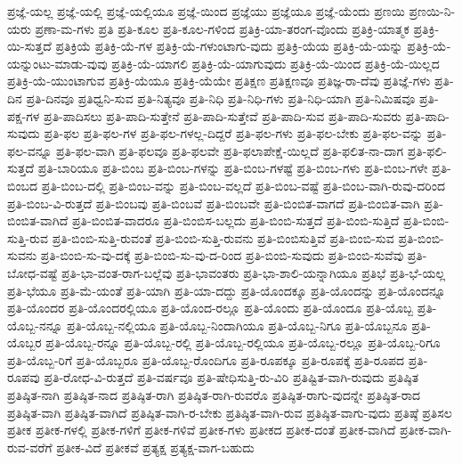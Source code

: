 {ಪ್ರಜ್ಞೆ-ಯಲ್ಲ
ಪ್ರಜ್ಞೆ-ಯಲ್ಲಿ
ಪ್ರಜ್ಞೆ-ಯಲ್ಲಿಯೂ
ಪ್ರಜ್ಞೆ-ಯಿಂದ
ಪ್ರಜ್ಞೆಯು
ಪ್ರಜ್ಞೆಯೂ
ಪ್ರಜ್ಞೆ-ಯೆಂದು
ಪ್ರಣಯಿ
ಪ್ರಣಯಿ-ನಿ-ಯರು
ಪ್ರಣಾ-ಮ-ಗಳು
ಪ್ರತಿ
ಪ್ರತಿ-ಕೂಲ
ಪ್ರತಿ-ಕೂಲ-ಗಳಿಂದ
ಪ್ರತಿಕ್ರಿ-ಯಾ-ತರಂಗ-ವೊಂದು
ಪ್ರತಿಕ್ರಿ-ಯಾತ್ಮಕ
ಪ್ರತಿಕ್ರಿ-ಯಿ-ಸುತ್ತದೆ
ಪ್ರತಿಕ್ರಿಯೆ
ಪ್ರತಿಕ್ರಿ-ಯೆ-ಗಳ
ಪ್ರತಿಕ್ರಿ-ಯೆ-ಗಳುಂಟಾಗು-ವುದು
ಪ್ರತಿಕ್ರಿ-ಯೆಯ
ಪ್ರತಿಕ್ರಿ-ಯೆ-ಯನ್ನು
ಪ್ರತಿಕ್ರಿ-ಯೆ-ಯನ್ನುಂಟು-ಮಾಡು-ವುವು
ಪ್ರತಿಕ್ರಿ-ಯೆ-ಯಾಗಲಿ
ಪ್ರತಿಕ್ರಿ-ಯೆ-ಯಾಗುವುದು
ಪ್ರತಿಕ್ರಿ-ಯೆ-ಯಿಂದ
ಪ್ರತಿಕ್ರಿ-ಯೆ-ಯಿಲ್ಲದ
ಪ್ರತಿಕ್ರಿ-ಯೆ-ಯುಂಟಾಗುವ
ಪ್ರತಿಕ್ರಿ-ಯೆಯೂ
ಪ್ರತಿಕ್ರಿ-ಯೆಯೇ
ಪ್ರತಿಕ್ಷಣ
ಪ್ರತಿಕ್ಷಣವೂ
ಪ್ರತಿಜ್ಞ-ರಾ-ದೆವು
ಪ್ರತಿಜ್ಞೆ-ಗಳು
ಪ್ರತಿ-ದಿನ
ಪ್ರತಿ-ದಿನವೂ
ಪ್ರತಿಧ್ವನಿ-ಸುವ
ಪ್ರತಿ-ನಿತ್ಯವೂ
ಪ್ರತಿ-ನಿಧಿ
ಪ್ರತಿ-ನಿಧಿ-ಗಳು
ಪ್ರತಿ-ನಿಧಿ-ಯಾಗಿ
ಪ್ರತಿ-ನಿಮಿಷವೂ
ಪ್ರತಿ-ಪಕ್ಷ-ಗಳ
ಪ್ರತಿ-ಪಾದಿಸಲು
ಪ್ರತಿ-ಪಾದಿ-ಸುತ್ತೇನೆ
ಪ್ರತಿ-ಪಾದಿ-ಸುತ್ತೇವೆ
ಪ್ರತಿ-ಪಾದಿ-ಸುವ
ಪ್ರತಿ-ಪಾದಿ-ಸುವರು
ಪ್ರತಿ-ಪಾದಿ-ಸುವುದು
ಪ್ರತಿ-ಫಲ
ಪ್ರತಿ-ಫಲ-ಗಳ
ಪ್ರತಿ-ಫಲ-ಗಳಲ್ಲ-ದಿದ್ದರೆ
ಪ್ರತಿ-ಫಲ-ಗಳು
ಪ್ರತಿ-ಫಲ-ಬೇಕು
ಪ್ರತಿ-ಫಲ-ವನ್ನು
ಪ್ರತಿ-ಫಲ-ವನ್ನೂ
ಪ್ರತಿ-ಫಲ-ವಾಗಿ
ಪ್ರತಿ-ಫಲವೂ
ಪ್ರತಿ-ಫಲವೇ
ಪ್ರತಿ-ಫಲಾಪೇಕ್ಷೆ-ಯಿಲ್ಲದೆ
ಪ್ರತಿ-ಫಲಿತ-ನಾ-ದಾಗ
ಪ್ರತಿ-ಫಲಿ-ಸುತ್ತದೆ
ಪ್ರತಿ-ಬಾರಿಯೂ
ಪ್ರತಿ-ಬಿಂಬ
ಪ್ರತಿ-ಬಿಂಬ-ಗಳನ್ನು
ಪ್ರತಿ-ಬಿಂಬ-ಗಳಷ್ಟೆ
ಪ್ರತಿ-ಬಿಂಬ-ಗಳು
ಪ್ರತಿ-ಬಿಂಬ-ಗಳೇ
ಪ್ರತಿ-ಬಿಂಬದ
ಪ್ರತಿ-ಬಿಂಬ-ದಲ್ಲಿ
ಪ್ರತಿ-ಬಿಂಬ-ವನ್ನು
ಪ್ರತಿ-ಬಿಂಬ-ವಲ್ಲದೆ
ಪ್ರತಿ-ಬಿಂಬ-ವಷ್ಟೆ
ಪ್ರತಿ-ಬಿಂಬ-ವಾಗಿ-ರುವು-ದರಿಂದ
ಪ್ರತಿ-ಬಿಂಬ-ವಿ-ರುತ್ತದೆ
ಪ್ರತಿ-ಬಿಂಬವು
ಪ್ರತಿ-ಬಿಂಬವೆ
ಪ್ರತಿ-ಬಿಂಬವೇ
ಪ್ರತಿ-ಬಿಂಬಿತ-ವಾಗದೆ
ಪ್ರತಿ-ಬಿಂಬಿತ-ವಾಗಿ
ಪ್ರತಿ-ಬಿಂಬಿತ-ವಾಗಿದೆ
ಪ್ರತಿ-ಬಿಂಬಿತ-ವಾದರೂ
ಪ್ರತಿ-ಬಿಂಬಿಸ-ಬಲ್ಲದು
ಪ್ರತಿ-ಬಿಂಬಿ-ಸುತ್ತದೆ
ಪ್ರತಿ-ಬಿಂಬಿ-ಸುತ್ತಿದೆ
ಪ್ರತಿ-ಬಿಂಬಿ-ಸುತ್ತಿ-ರುವ
ಪ್ರತಿ-ಬಿಂಬಿ-ಸುತ್ತಿ-ರುವಂತೆ
ಪ್ರತಿ-ಬಿಂಬಿ-ಸುತ್ತಿ-ರುವನು
ಪ್ರತಿ-ಬಿಂಬಿಸುತ್ತಿವೆ
ಪ್ರತಿ-ಬಿಂಬಿ-ಸುವ
ಪ್ರತಿ-ಬಿಂಬಿ-ಸುವನು
ಪ್ರತಿ-ಬಿಂಬಿ-ಸು-ವು-ದಕ್ಕೆ
ಪ್ರತಿ-ಬಿಂಬಿ-ಸು-ವು-ದ-ರಿಂದ
ಪ್ರತಿ-ಬಿಂಬಿ-ಸುವುದು
ಪ್ರತಿ-ಬಿಂಬಿ-ಸುವೆವು
ಪ್ರತಿ-ಬೋಧ-ವಷ್ಟೆ
ಪ್ರತಿ-ಭಾ-ವಂತ-ರಾಗ-ಬಲ್ಲೆವು
ಪ್ರತಿ-ಭಾವಂತರು
ಪ್ರತಿ-ಭಾ-ಶಾಲಿ-ಯನ್ನಾಗಿಯೂ
ಪ್ರತಿಭೆ
ಪ್ರತಿ-ಭೆ-ಯಲ್ಲ
ಪ್ರತಿ-ಭೆಯೂ
ಪ್ರತಿ-ಮೆ-ಯಂತೆ
ಪ್ರತಿ-ಯಾಗಿ
ಪ್ರತಿ-ಯಾ-ದದ್ದು
ಪ್ರತಿ-ಯೊಂದಕ್ಕೂ
ಪ್ರತಿ-ಯೊಂದನ್ನು
ಪ್ರತಿ-ಯೊಂದನ್ನೂ
ಪ್ರತಿ-ಯೊಂದರ
ಪ್ರತಿ-ಯೊಂದರಲ್ಲಿಯೂ
ಪ್ರತಿ-ಯೊಂದ-ರಲ್ಲೂ
ಪ್ರತಿ-ಯೊಂದು
ಪ್ರತಿ-ಯೊಂದೂ
ಪ್ರತಿ-ಯೊಬ್ಬ
ಪ್ರತಿ-ಯೊಬ್ಬ-ನನ್ನೂ
ಪ್ರತಿ-ಯೊಬ್ಬ-ನಲ್ಲಿಯೂ
ಪ್ರತಿ-ಯೊಬ್ಬ-ನಿಂದಾಗಿಯೂ
ಪ್ರತಿ-ಯೊಬ್ಬ-ನಿಗೂ
ಪ್ರತಿ-ಯೊಬ್ಬನೂ
ಪ್ರತಿ-ಯೊಬ್ಬರ
ಪ್ರತಿ-ಯೊಬ್ಬ-ರನ್ನೂ
ಪ್ರತಿ-ಯೊಬ್ಬ-ರಲ್ಲಿ
ಪ್ರತಿ-ಯೊಬ್ಬ-ರಲ್ಲಿಯೂ
ಪ್ರತಿ-ಯೊಬ್ಬ-ರಲ್ಲೂ
ಪ್ರತಿ-ಯೊಬ್ಬ-ರಿಗೂ
ಪ್ರತಿ-ಯೊಬ್ಬ-ರಿಗೆ
ಪ್ರತಿ-ಯೊಬ್ಬರೂ
ಪ್ರತಿ-ಯೊಬ್ಬ-ರೊಂದಿಗೂ
ಪ್ರತಿ-ರೂಪಕ್ಕೂ
ಪ್ರತಿ-ರೂಪಕ್ಕೆ
ಪ್ರತಿ-ರೂಪದ
ಪ್ರತಿ-ರೂಪವು
ಪ್ರತಿ-ರೋಧ-ವಿ-ರುತ್ತದೆ
ಪ್ರತಿ-ವರ್ಷವೂ
ಪ್ರತಿ-ಷೇಧಿಸುತ್ತಿ-ರು-ವಿರಿ
ಪ್ರತಿಷ್ಟಿತ-ವಾಗಿ-ರುವುದು
ಪ್ರತಿಷ್ಠಿತ
ಪ್ರತಿಷ್ಠಿತ-ನಾಗಿ
ಪ್ರತಿಷ್ಠಿತ-ನಾದ
ಪ್ರತಿಷ್ಠಿತ-ರಾಗಿ
ಪ್ರತಿಷ್ಠಿತ-ರಾಗಿ-ರುವರೊ
ಪ್ರತಿಷ್ಠಿತ-ರಾಗು-ವುದನ್ನೇ
ಪ್ರತಿಷ್ಠಿತ-ರಾದ
ಪ್ರತಿಷ್ಠಿತ-ವಾಗಿ
ಪ್ರತಿಷ್ಠಿತ-ವಾಗಿದೆ
ಪ್ರತಿಷ್ಠಿತ-ವಾಗಿ-ರ-ಬೇಕು
ಪ್ರತಿಷ್ಠಿತ-ವಾಗಿ-ರುವ
ಪ್ರತಿಷ್ಠಿತ-ವಾಗು-ವುದು
ಪ್ರತಿಷ್ಠೆ
ಪ್ರತಿಸಲ
ಪ್ರತೀಕ
ಪ್ರತೀಕ-ಗಳಲ್ಲಿ
ಪ್ರತೀಕ-ಗಳಿಗೆ
ಪ್ರತೀಕ-ಗಳಿವೆ
ಪ್ರತೀಕ-ಗಳು
ಪ್ರತೀಕದ
ಪ್ರತೀಕ-ದಂತೆ
ಪ್ರತೀಕ-ವಾಗಿದೆ
ಪ್ರತೀಕ-ವಾಗಿ-ರುವ-ವರೆಗೆ
ಪ್ರತೀಕ-ವಿದೆ
ಪ್ರತೀಕವೆ
ಪ್ರತ್ಯಕ್ಷ
ಪ್ರತ್ಯಕ್ಷ-ವಾಗ-ಬಹುದು
}
